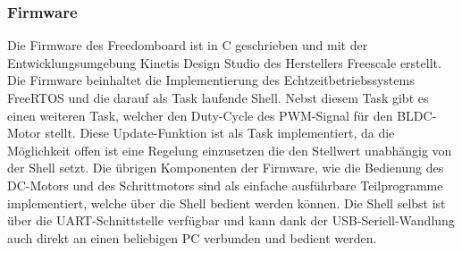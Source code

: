 \subsubsection{Firmware}
Die Firmware des Freedomboard ist in C geschrieben und mit der
Entwicklungsumgebung Kinetis Design Studio des Herstellers
Freescale erstellt. Die Firmware beinhaltet die Implementierung
des Echtzeitbetriebssystems FreeRTOS und die darauf als Task
laufende Shell. Nebst diesem Task gibt es einen weiteren Task,
welcher den Duty-Cycle des PWM-Signal für den BLDC-Motor stellt.
Diese Update-Funktion ist als Task implementiert, da die
Möglichkeit offen ist eine Regelung einzusetzen die den Stellwert
unabhängig von der Shell setzt. Die übrigen Komponenten der
Firmware, wie die Bedienung des DC-Motors und des Schrittmotors
sind als einfache ausführbare Teilprogramme implementiert, welche
über die Shell bedient werden können. Die Shell selbst ist über
die UART-Schnittstelle verfügbar und kann dank der
USB-Seriell-Wandlung auch direkt an einen beliebigen PC verbunden
und bedient werden.


